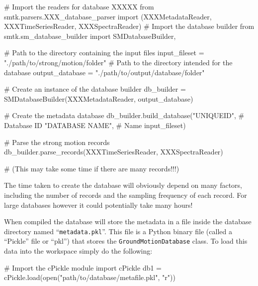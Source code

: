 \begin{python}[frame=single]
# Import the readers for database XXXXX
from smtk.parsers.XXX_database_parser import (XXXMetadataReader,
                                              XXXTimeSeriesReader,
                                              XXXSpectraReader)
# Import the database builder
from smtk.sm_database_builder import SMDatabaseBuilder,

# Path to the directory containing the input files
input_fileset = "./path/to/strong/motion/folder"
# Path to the directory intended for the database
output_database = "./path/to/output/database/folder"

# Create an instance of the database builder
db_builder = SMDatabaseBuilder(XXXMetadataReader,
                               output_database)

# Create the metadata database
db_builder.build_database("UNIQUEID",  # Database ID
                          "DATABASE NAME",  # Name
                          input_fileset)

# Parse the strong motion records
db_builder.parse_records(XXXTimeSeriesReader,
                         XXXSpectraReader)

# (This may take some time if there are many records!!!)
\end{python}



The time taken to create the database will obviously depend on many factors, including the number of records and the sampling frequency of each record. For large databases however it could potentially take many hours!

When compiled the database will store the metadata in a file inside the database directory named ``\verb=metadata.pkl=''. This file is a Python binary file (called a ``Pickle'' file or ``pkl'') that stores the \verb=GroundMotionDatabase= class. To load this data into the workspace simply do the following:

\begin{python}[frame=single]
# Import the cPickle module
import cPickle
db1 = cPickle.load(open("path/to/database/metafile.pkl", "r"))
\end{python}


